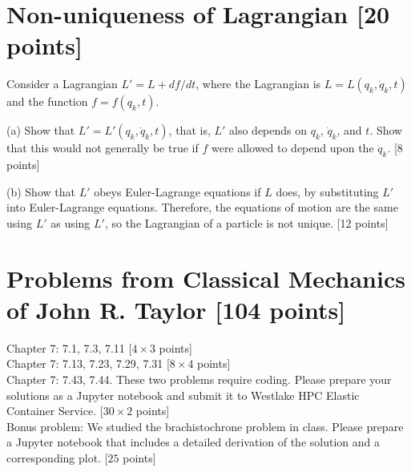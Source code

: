 \documentclass[11pt, a4paper]{article} %
\begin{document}
\newpage 
\section*{Non-uniqueness of Lagrangian [20 points]} 
Consider a Lagrangian $L'=L+df/dt$, where the Lagrangian is $L = L(q_k,\dot{q}_k,t)$ and the function $f=f(q_k,t)$. 

(a) Show that $L' = L'(q_k,\dot{q}_k,t)$, that is, $L'$ also depends on $q_k$, $\dot{q}_k$, and $t$. Show that this would not generally be true if $f$ were allowed to depend upon the $\dot{q}_k$. [8 points]

(b) Show that $L'$ obeys Euler-Lagrange equations if $L$ does, by substituting $L'$ into Euler-Lagrange equations. Therefore, the equations of motion are the same using $L'$ as using $L'$, so the Lagrangian of a particle is not unique. [12 points]

\newpage 
\section*{Problems from Classical Mechanics of John R. Taylor [104 points]} 
Chapter 7: 7.1, 7.3, 7.11 [$4\times3$ points]\\
Chapter 7: 7.13, 7.23, 7.29, 7.31 [$8\times4$ points]\\
Chapter 7: 7.43, 7.44. These two problems require coding. Please prepare your solutions as a Jupyter notebook and submit it to Westlake HPC Elastic Container Service.   [$30\times2$ points]\\
Bonus problem: We studied the brachistochrone problem in class. Please prepare a Jupyter notebook that includes a detailed derivation of the solution and a corresponding plot. [$25$ points]\\
\end{document}
